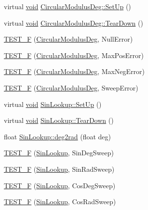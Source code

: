 \begin{DoxyCompactItemize}
\item 
virtual \hyperlink{group___n_a_m_e_ga18028b8badbf1ea7e704ccac3c488e82}{void} \hyperlink{group___unit_tests_gade916660611f66dc899b964b8d064166}{Circular\-Modulus\-Deg\-::\-Set\-Up} ()
\item 
virtual \hyperlink{group___n_a_m_e_ga18028b8badbf1ea7e704ccac3c488e82}{void} \hyperlink{group___unit_tests_gab07ca9308f02057fa2623a51eb709aac}{Circular\-Modulus\-Deg\-::\-Tear\-Down} ()
\item 
\hyperlink{group___unit_tests_ga17693a11d324ba463ae792d590bee714}{T\-E\-S\-T\-\_\-\-F} (\hyperlink{class_circular_modulus_deg}{Circular\-Modulus\-Deg}, Null\-Error)
\item 
\hyperlink{group___unit_tests_gab74bc4a71915e6b66efa543d8162af35}{T\-E\-S\-T\-\_\-\-F} (\hyperlink{class_circular_modulus_deg}{Circular\-Modulus\-Deg}, Max\-Pos\-Error)
\item 
\hyperlink{group___unit_tests_ga399c1468b3de50cedea1c29e281f0387}{T\-E\-S\-T\-\_\-\-F} (\hyperlink{class_circular_modulus_deg}{Circular\-Modulus\-Deg}, Max\-Neg\-Error)
\item 
\hyperlink{group___unit_tests_gae9b10024a005563e17340713ce445a15}{T\-E\-S\-T\-\_\-\-F} (\hyperlink{class_circular_modulus_deg}{Circular\-Modulus\-Deg}, Sweep\-Error)
\item 
virtual \hyperlink{group___n_a_m_e_ga18028b8badbf1ea7e704ccac3c488e82}{void} \hyperlink{group___unit_tests_gaf5c7e4b5a50e259ba0c95e5134d66b9b}{Sin\-Lookup\-::\-Set\-Up} ()
\item 
virtual \hyperlink{group___n_a_m_e_ga18028b8badbf1ea7e704ccac3c488e82}{void} \hyperlink{group___unit_tests_ga93c08f4058ee3f8c7de2ac69b799b386}{Sin\-Lookup\-::\-Tear\-Down} ()
\item 
float \hyperlink{group___unit_tests_gab9e378171158291991120fdea72f48f0}{Sin\-Lookup\-::deg2rad} (float deg)
\item 
\hyperlink{group___unit_tests_ga0f957c5a6bc6cb673ad664bbdc389721}{T\-E\-S\-T\-\_\-\-F} (\hyperlink{class_sin_lookup}{Sin\-Lookup}, Sin\-Deg\-Sweep)
\item 
\hyperlink{group___unit_tests_ga28cf6df5edd30421eba939fc8b6951d7}{T\-E\-S\-T\-\_\-\-F} (\hyperlink{class_sin_lookup}{Sin\-Lookup}, Sin\-Rad\-Sweep)
\item 
\hyperlink{group___unit_tests_gaf59634da9fe51f87255171f2b26412ff}{T\-E\-S\-T\-\_\-\-F} (\hyperlink{class_sin_lookup}{Sin\-Lookup}, Cos\-Deg\-Sweep)
\item 
\hyperlink{group___unit_tests_gab85081745f2bed950e8b3c8a383711e0}{T\-E\-S\-T\-\_\-\-F} (\hyperlink{class_sin_lookup}{Sin\-Lookup}, Cos\-Rad\-Sweep)
\end{DoxyCompactItemize}
